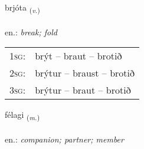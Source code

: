 \documentclass[frontgrid, backgrid]{flacards}\usepackage[]{graphicx}\usepackage[]{xcolor}
\begin{document}
\renewcommand{\flhead}{\vskip5pt \fboxsep=0pt {\small\bfseries\footnotesize Sagnorð | Verb}}
\renewcommand{\fcfoot}{\vskip5pt \fboxsep=0pt \hspace{2pt}{\small\bfseries\footnotesize 1K}}

\renewcommand{\blhead}{\vskip5pt {\small\bfseries\footnotesize Sagnorð | Verb }}
\renewcommand{\bcfoot}{\vskip5pt \hspace{2pt}{\small\bfseries\footnotesize 1K}}


{brjóta \small{\textsubscript{(\textit{v.})}} \\[1ex] %
\textphonetic{[prjouːta]} \\
en.: \emph{break; fold} \\  [2ex]
\renewcommand*{\arraystretch}{0.8}
\begin{tabular}{p{1cm}l}
\textsc{1sg}: & brýt -- braut -- brotið \\ 
\textsc{2sg}: & brýtur -- braust -- brotið \\ 
\textsc{3sg}: & brýtur -- braut -- brotið \\ 
\end{tabular}
}

\renewcommand{\flhead}{\vskip5pt \fboxsep=0pt {\small\bfseries\footnotesize Nafnorð | Noun}}
\renewcommand{\fcfoot}{\vskip5pt \fboxsep=0pt \hspace{2pt}{\small\bfseries\footnotesize 1K}}

\renewcommand{\blhead}{\vskip5pt {\small\bfseries\footnotesize Nafnorð | Noun }}
\renewcommand{\bcfoot}{\vskip5pt \hspace{2pt}{\small\bfseries\footnotesize 1K}}


{félagi \small{\textsubscript{(\textit{m.})}} \\[1ex] %
\textphonetic{[fjɛːlaijɪ]} \\
en.: \emph{companion; partner; member} \\  [2ex]
\renewcommand*{\arraystretch}{0.8}
}
\end{document}
